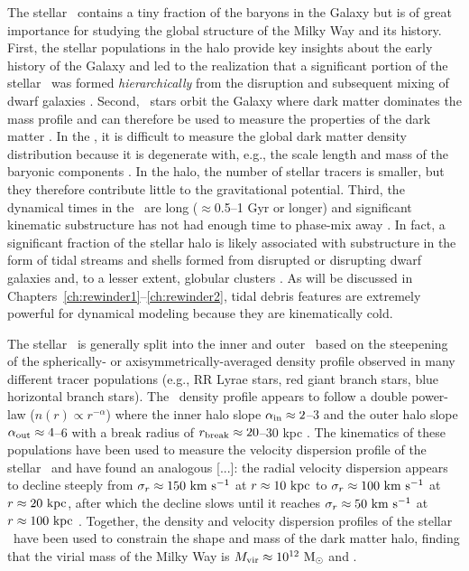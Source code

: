 The stellar \mwhalo\ contains a tiny fraction of the baryons in the Galaxy
\citep[$\approx$1\%;][]{bell08} but is of great importance for studying the
global structure of the Milky Way and its history. First, the stellar
populations in the halo provide key insights about the early history of the
Galaxy and led to the realization that a significant portion of the stellar
\mwhalo\ was formed \emph{hierarchically} from the disruption and subsequent
mixing of dwarf galaxies \citep[e.g.,][]{searle78, bullock05, bell08}. Second,
\mwhalo\ stars orbit the Galaxy where dark matter dominates the mass profile and
can therefore be used to measure the properties of the dark matter \mwhalo. In
the \mwdisk, it is difficult to measure the global dark matter density
distribution because it is degenerate with, e.g., the scale length and mass of
the baryonic components \citep{oort32,holmberg04,dehnen98a,sofue09}. In the
halo, the number of stellar tracers is smaller, but they therefore contribute
little to the gravitational potential. Third, the dynamical times in the
\mwhalo\ are long ($\approx$0.5--1 Gyr or longer) and significant kinematic
substructure has not had enough time to phase-mix away \citep{helmi99}. In fact,
a significant fraction \citep[$\approx$40--50\%;][]{bell08} of the stellar halo
is likely associated with substructure in the form of tidal streams and shells
formed from disrupted or disrupting dwarf galaxies and, to a lesser extent,
globular clusters \citep[e.g.,][]{newberg02,majewski03,belokurov06}. As will be
discussed in Chapters~\ref{ch:rewinder1}--\ref{ch:rewinder2}, tidal debris
features are extremely powerful for dynamical modeling because they are
kinematically cold.

The stellar \mwhalo\ is generally split into the inner and outer \mwhalo\ based
on the steepening of the spherically- or axisymmetrically-averaged density
profile observed in many different tracer populations (e.g., RR Lyrae stars, red
giant branch stars, blue horizontal branch stars). The \mwhalo\ density profile
appears to follow a double power-law ($n(r) \propto r^{-\alpha}$) where the
inner halo slope $\alpha_{\rm in} \approx 2$--3 and the outer halo slope
$\alpha_{\rm out} \approx 4$--6 with a break radius of $r_{\rm break} \approx
20$--30 kpc \citep{watkins09, sesar10, deason11, sesar11, sesar13a}. The
kinematics of these populations have been used to measure the velocity
dispersion profile of the stellar \mwhalo\ and have found an analogous [...]:
the radial velocity dispersion appears to decline steeply from $\sigma_r \approx
150~\mathrm{km}~\mathrm{s}^{-1}$ at $r\approx10~\mathrm{kpc}$ to $\sigma_r \approx 100~\mathrm{km}~\mathrm{s}^{-1}$ at
$r\approx20~\mathrm{kpc}$, after which the decline slows until it reaches $\sigma_r
\approx 50~\mathrm{km}~\mathrm{s}^{-1}$ at $r\approx100~\mathrm{kpc}$ \citep{battaglia05, xue08, brown10,
deason12b, deason13}. Together, the density and velocity dispersion profiles of
the stellar \mwhalo\ have been used to constrain the shape and mass of the dark
matter halo, finding that the virial mass of the Milky Way is $M_{\rm vir}
\approx 10^{12}~\mathrm{M}_\odot$ and .

